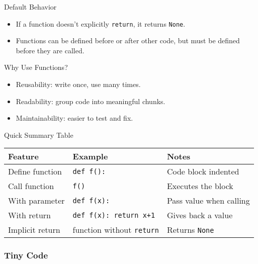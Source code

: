 \documentclass[
  letterpaper,
  DIV=11,
  numbers=noendperiod]{scrreprt}
\providecommand{\tightlist}{%
  \setlength{\itemsep}{0pt}\setlength{\parskip}{0pt}}
\begin{document}
Default Behavior

\begin{itemize}
\tightlist
\item
  If a function doesn't explicitly \texttt{return}, it returns
  \texttt{None}.
\item
  Functions can be defined before or after other code, but must be
  defined before they are called.
\end{itemize}

Why Use Functions?

\begin{itemize}
\tightlist
\item
  Reusability: write once, use many times.
\item
  Readability: group code into meaningful chunks.
\item
  Maintainability: easier to test and fix.
\end{itemize}

Quick Summary Table

\begin{longtable}[]{@{}
  >{\raggedright\arraybackslash}p{}
  >{\raggedright\arraybackslash}p{}
  >{\raggedright\arraybackslash}p{}@{}}
\toprule\noalign{}
\begin{minipage}[b]{\linewidth}\raggedright
Feature
\end{minipage} & \begin{minipage}[b]{\linewidth}\raggedright
Example
\end{minipage} & \begin{minipage}[b]{\linewidth}\raggedright
Notes
\end{minipage} \\
\midrule\noalign{}
\endhead
\bottomrule\noalign{}
\endlastfoot
Define function & \texttt{def\ f():} & Code block indented \\
Call function & \texttt{f()} & Executes the block \\
With parameter & \texttt{def\ f(x):} & Pass value when calling \\
With return & \texttt{def\ f(x):\ return\ x+1} & Gives back a value \\
Implicit return & function without \texttt{return} & Returns
\texttt{None} \\
\end{longtable}

\subsubsection{Tiny Code}\label{tiny-code-30}
\end{document}
